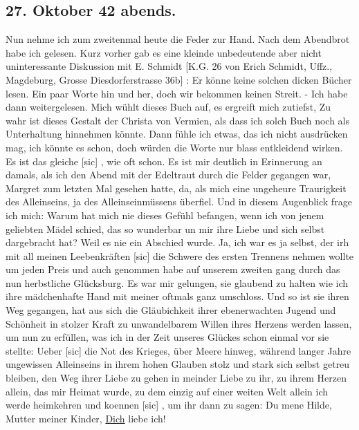 \subsection{27. Oktober 42   abends.}

Nun nehme ich zum zweitenmal heute die Feder zur Hand.
Nach dem Abendbrot habe ich gelesen.
Kurz vorher gab es eine kleinde unbedeutende aber nicht uninteressante Diskussion mit E. Schmidt {\color{red} [K.G. 26 von Erich Schmidt, Uffz., Magdeburg, Grosse Diesdorferstrasse 36b] }: Er k\"{o}nne keine solchen dicken B\"{u}cher lesen.
Ein paar Worte hin und her, doch wir bekommen keinen Streit.
- Ich habe dann weitergelesen.
Mich w\"{u}hlt dieses Buch auf, es ergreift mich zutiefst,
Zu wahr ist dieses Gestalt der Christa von Vermien, als dass ich solch Buch noch als Unterhaltung hinnehmen k\"{o}nnte.
Dann f\"{u}hle ich etwas, das ich nicht ausdr\"{u}cken mag, ich k\"{o}nnte es schon, doch w\"{u}rden die Worte nur blass entkleidend wirken.
Es ist das gleiche{\color{red} [sic] }, wie oft schon.
Es ist mir deutlich in Erinnerung an damals, als ich den Abend mit der Edeltraut durch die Felder gegangen war, Margret zum letzten Mal gesehen hatte, da, als mich eine ungeheure Traurigkeit des Alleinseins, ja des Alleinseinm\"{u}ssens \"{u}berfiel.
Und in diesem Augenblick frage ich mich: Warum hat mich nie dieses Gef\"{u}hl befangen, wenn ich von jenem geliebten M\"{a}del schied, das so wunderbar un  mir ihre Liebe und sich selbst dargebracht hat?
Weil es nie ein Abschied wurde.
Ja, ich war es ja selbst, der irh mit all meinen Leebenkr\"{a}ften{\color{red} [sic] } die Schwere des ersten Trennens nehmen wollte um jeden Preis und auch genommen habe auf unserem zweiten gang durch das nun herbstliche Gl\"{u}cksburg.
Es war mir gelungen, sie glaubend zu halten wie ich ihre m\"{a}dchenhafte Hand mit meiner oftmals ganz umschloss.
Und so ist sie ihren Weg gegangen, hat aus sich die Gl\"{a}ubichkeit ihrer ebenerwachten Jugend und Sch\"{o}nheit in stolzer Kraft zu unwandelbarem Willen ihres Herzens werden lassen, um nun zu erf\"{u}llen, was ich in der Zeit unseres Gl\"{u}ckes schon einmal vor sie stellte: Ueber{\color{red} [sic] } die Not des Krieges, \"{u}ber Meere hinweg, w\"{a}hrend langer Jahre ungewissen Alleinseins in ihrem hohen Glauben stolz und stark sich selbst getreu bleiben, den Weg ihrer Liebe zu gehen in meinder Liebe zu ihr, zu ihrem Herzen allein, das mir Heimat wurde, zu dem einzig auf einer weiten Welt allein ich werde heimkehren und koennen{\color{red} [sic] }, um ihr dann zu sagen: Du mene Hilde, Mutter meiner Kinder, \ul{Dich} liebe ich!

\clearpage
